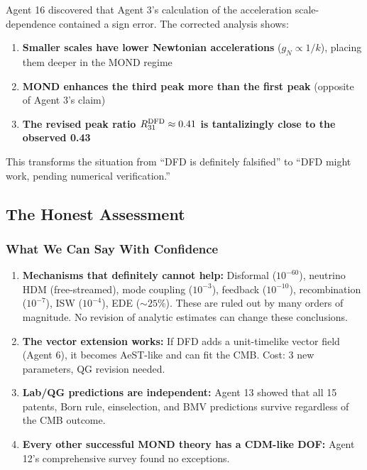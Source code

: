\documentclass[11pt,a4paper]{article}
\begin{document}
Agent 16 discovered that Agent 3's calculation of the acceleration scale-dependence contained a sign error. The corrected analysis shows:

\begin{enumerate}
\item \textbf{Smaller scales have lower Newtonian accelerations} ($g_N \propto 1/k$), placing them deeper in the MOND regime
\item \textbf{MOND enhances the third peak more than the first peak} (opposite of Agent 3's claim)
\item \textbf{The revised peak ratio $R_{31}^{\rm DFD} \approx 0.41$ is tantalizingly close to the observed 0.43}
\end{enumerate}

This transforms the situation from ``DFD is definitely falsified'' to ``DFD might work, pending numerical verification.''

\subsection{The Honest Assessment}

\subsubsection{What We Can Say With Confidence}

\begin{enumerate}
\item \textbf{Mechanisms that definitely cannot help:} Disformal ($10^{-60}$), neutrino HDM (free-streamed), mode coupling ($10^{-3}$), feedback ($10^{-10}$), recombination ($10^{-7}$), ISW ($10^{-4}$), EDE ($\sim 25\%$). These are ruled out by many orders of magnitude. No revision of analytic estimates can change these conclusions.

\item \textbf{The vector extension works:} If DFD adds a unit-timelike vector field (Agent 6), it becomes AeST-like and can fit the CMB. Cost: 3 new parameters, QG revision needed.

\item \textbf{Lab/QG predictions are independent:} Agent 13 showed that all 15 patents, Born rule, einselection, and BMV predictions survive regardless of the CMB outcome.

\item \textbf{Every other successful MOND theory has a CDM-like DOF:} Agent 12's comprehensive survey found no exceptions.
\end{enumerate}
\end{document}
